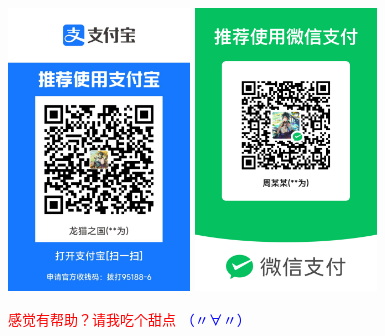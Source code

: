 \noindent\begin{minipage}[c]{\textwidth}
    \centering
    \includegraphics[height=7.5cm]{Ali_Pay.jpg}\qquad%
    \includegraphics[height=7.5cm]{Wechat_Pay.jpg}

    \textcolor{red}{感觉有帮助？请我吃个甜点} \textcolor{blue}{（〃∀〃）}
\end{minipage}
